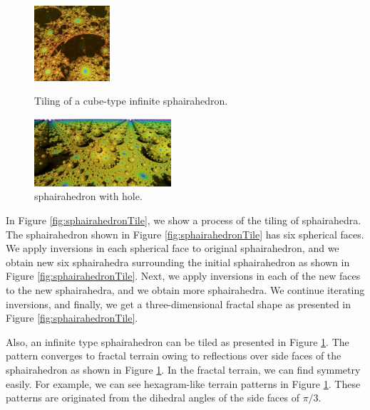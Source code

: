 \documentclass[dvipdfmx]{interact}
\theoremstyle{plain}%
\theoremstyle{definition}
\theoremstyle{remark}
\theoremstyle{problemstyle}
\begin{document}
\begin{figure}[h!tbp]
 \hspace*{\fill}
 \begin{minipage}[t]{0.18\textwidth}
  \centering
  \includegraphics[height=1.1in, keepaspectratio]{./img/constructFractal/terrainProcess/final.jpg}
  \label{fig:sphairaPrismFinal}
 \end{minipage}
 \caption{Tiling of a cube-type infinite sphairahedron.}
 \label{fig:sphairahedralPrismTile}
\end{figure}

\begin{figure}[h!tbp]
  \centering
 \includegraphics[width=2in,
 keepaspectratio]{./img/constructFractal/semi-terrain2.png}
 \caption{sphairahedron with hole.}
  \label{fig:semiSphairaSpheres}
\end{figure}

In Figure \ref{fig:sphairahedronTile}, we show a process of the tiling of
sphairahedra.
The sphairahedron shown in Figure
\ref{fig:sphairahedronTile} has six spherical
faces.
We apply inversions in each spherical face to original sphairahedron,
and we obtain new six sphairahedra surrounding the initial sphairahedron
as shown in Figure
\ref{fig:sphairahedronTile}.
Next, we apply inversions in each of the new faces to the new sphairahedra,
and we obtain more sphairahedra.
We continue iterating inversions, and finally, we get a three-dimensional
fractal shape as presented in Figure
\ref{fig:sphairahedronTile}.

Also, an infinite type sphairahedron can be tiled as presented in Figure
\ref{fig:sphairahedralPrismTile}.
The pattern converges to fractal terrain owing to reflections over side
faces of the sphairahedron as shown in Figure 
\ref{fig:sphairahedralPrismTile}.
In the fractal terrain, we can find symmetry easily.
For example, we can see hexagram-like terrain patterns in Figure
\ref{fig:sphairahedralPrismTile}.
These patterns are originated from the dihedral angles of the side faces of
$\pi / 3$.
\end{document}
